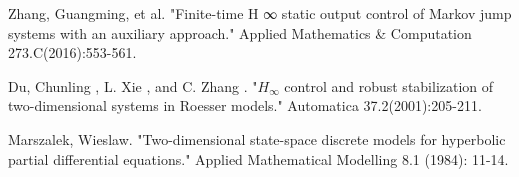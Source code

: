 \documentclass[conference]{IEEEtran}
\begin{document}

%
%


\begin{thebibliography}{1}
	
	Zhang, Guangming, et al. "Finite-time H ∞ static output control of Markov jump systems with an auxiliary approach." Applied Mathematics \& Computation 273.C(2016):553-561.
	
	Du, Chunling , L. Xie , and C. Zhang . "$H_{\infty}$ control and robust stabilization of two-dimensional systems in Roesser models." Automatica 37.2(2001):205-211.
	
	Marszalek, Wieslaw. "Two-dimensional state-space discrete models for hyperbolic partial differential equations." Applied Mathematical Modelling 8.1 (1984): 11-14.
	
	
	
\end{thebibliography}




\end{document}
